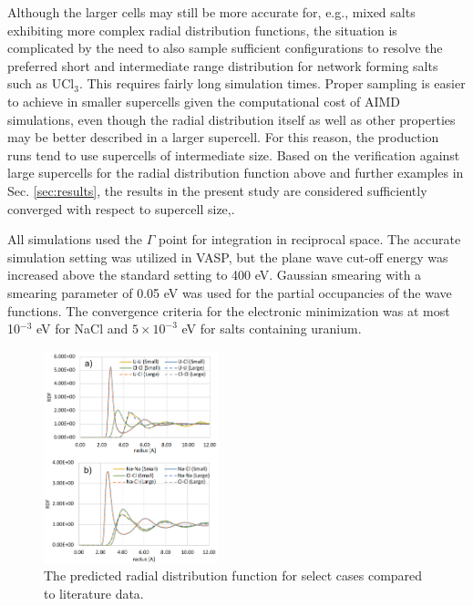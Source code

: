 \documentclass[preprint,3p,10pt,twocolumn,number,sort&compress]{elsarticle}
\begin{document}
Although the larger cells may still be more accurate for, e.g., mixed salts exhibiting more complex radial distribution functions, the situation is complicated by the need to also sample sufficient configurations to resolve the preferred short and intermediate range distribution for network forming salts such as UCl$_3$. This requires fairly long simulation times. %
Proper sampling is easier to achieve in smaller supercells given the computational cost of AIMD simulations, even though the radial distribution itself as well as other properties may be better described in a larger supercell. For this reason, the production runs tend to use supercells of intermediate size.  Based on the verification against large supercells for the radial distribution function above and further examples in Sec. \ref{sec:results}, the results in the present study are considered sufficiently converged with respect to supercell size,.

All simulations used the $\Gamma$ point for integration in reciprocal space. The accurate simulation setting was utilized in VASP, but the plane wave cut-off energy was increased above the standard setting to 400 eV. Gaussian smearing with a smearing parameter of 0.05 eV was used for the partial occupancies of the wave functions. The convergence criteria for the electronic minimization was at most 10$^{-3}$ eV for NaCl and $5\times10^{-3}$ eV for salts containing uranium. 

\begin{figure}[htb]
\centering
\includegraphics[width=0.45\textwidth]{./figures/FIG1_0_BB.png}
\caption{The predicted radial distribution function for select cases compared to literature data.} 
\label{fig:radial}
\end{figure}
\end{document}
